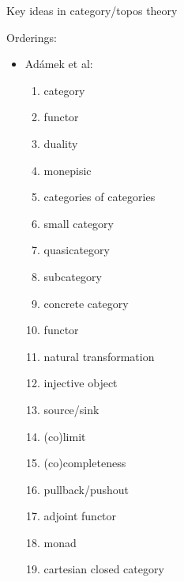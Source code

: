 \begin{plSection}{Key ideas in category/topos theory}
\label{sec:Key-ideas}

Orderings:
\begin{itemize}
 
\item Ad\'{a}mek et al:~\cite{AdamekHerrlichStrecker:1990}
\begin{enumerate}
  \item category 
  \item functor
  \item duality
  \item monepisic
  \item categories of categories 
  \item small category
  \item quasicategory
  \item subcategory
  \item concrete category
  \item functor
  \item natural transformation
  \item injective object
  \item source/sink
  \item (co)limit
  \item (co)completeness
  \item pullback/pushout
  \item adjoint functor
  \item monad
  \item cartesian closed category
\end{enumerate}


\end{itemize}
\end{plSection}
